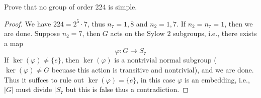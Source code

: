 \documentclass[openany]{book}
\begin{document}
\begin{prob}
    Prove that no group of order 224 is simple.
\end{prob}
\begin{proof}
    We have $224=2^5\cdot 7$, thus $n_7=1,8$ and $n_2=1,7$. If $n_2=n_7=1$, then we are done. Suppose $n_2=7$, then $G$ acts on the Sylow $2$ subgroups, i.e., there exists a map 
    \begin{equation*}
        \varphi: G\to S_7
    \end{equation*}
    If $\ker(\varphi)\neq \{e\}$, then $\ker(\varphi)$ is a nontrivial normal subgroup ($\ker(\varphi)\neq G$ becuase this action is transitive and nontrivial), and we are done.  Thus it suffces to rule out $\ker(\varphi)=\{e\}$, in this case $\varphi$ is an embedding, i.e., $|G|$ must divide $|S_7$ but this is false thus a contradiction. 
\end{proof}
\end{document}
